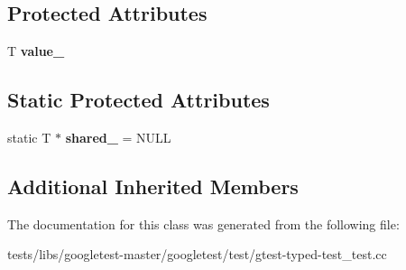 \subsection*{Protected Attributes}
\begin{DoxyCompactItemize}
\item 
\mbox{\label{classCommonTest_ae59c4abcb833625a7baeb2048531ebec}} 
T {\bfseries value\+\_\+}
\end{DoxyCompactItemize}
\subsection*{Static Protected Attributes}
\begin{DoxyCompactItemize}
\item 
\mbox{\label{classCommonTest_a52368ce1e65a865db9bdccbcc2cedaac}} 
static T $\ast$ {\bfseries shared\+\_\+} = N\+U\+LL
\end{DoxyCompactItemize}
\subsection*{Additional Inherited Members}


The documentation for this class was generated from the following file\+:\begin{DoxyCompactItemize}
\item 
tests/libs/googletest-\/master/googletest/test/gtest-\/typed-\/test\+\_\+test.\+cc\end{DoxyCompactItemize}
